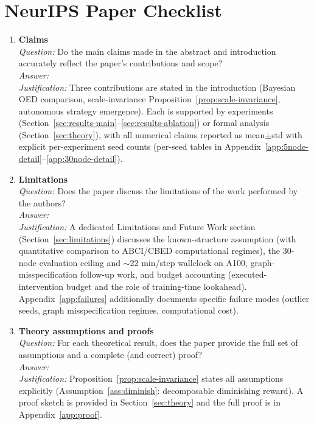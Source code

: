 
\section*{NeurIPS Paper Checklist}

\begin{enumerate}

\item \textbf{Claims}\\
\emph{Question:} Do the main claims made in the abstract and introduction accurately reflect the paper's contributions and scope?\\
\emph{Answer:} \answerYes{}\\
\emph{Justification:} Three contributions are stated in the introduction (Bayesian OED comparison, scale-invariance Proposition~\ref{prop:scale-invariance}, autonomous strategy emergence). Each is supported by experiments (Section~\ref{sec:results-main}--\ref{sec:results-ablation}) or formal analysis (Section~\ref{sec:theory}), with all numerical claims reported as mean$\pm$std with explicit per-experiment seed counts (per-seed tables in Appendix~\ref{app:5node-detail}--\ref{app:30node-detail}).

\item \textbf{Limitations}\\
\emph{Question:} Does the paper discuss the limitations of the work performed by the authors?\\
\emph{Answer:} \answerYes{}\\
\emph{Justification:} A dedicated Limitations and Future Work section (Section~\ref{sec:limitations}) discusses the known-structure assumption (with quantitative comparison to ABCI/CBED computational regimes), the 30-node evaluation ceiling and $\sim$22 min/step wallclock on A100, graph-misspecification follow-up work, and budget accounting (executed-intervention budget and the role of training-time lookahead). Appendix~\ref{app:failures} additionally documents specific failure modes (outlier seeds, graph misspecification regimes, computational cost).

\item \textbf{Theory assumptions and proofs}\\
\emph{Question:} For each theoretical result, does the paper provide the full set of assumptions and a complete (and correct) proof?\\
\emph{Answer:} \answerYes{}\\
\emph{Justification:} Proposition~\ref{prop:scale-invariance} states all assumptions explicitly (Assumption~\ref{ass:diminish}: decomposable diminishing reward). A proof sketch is provided in Section~\ref{sec:theory} and the full proof is in Appendix~\ref{app:proof}.


\end{enumerate}
